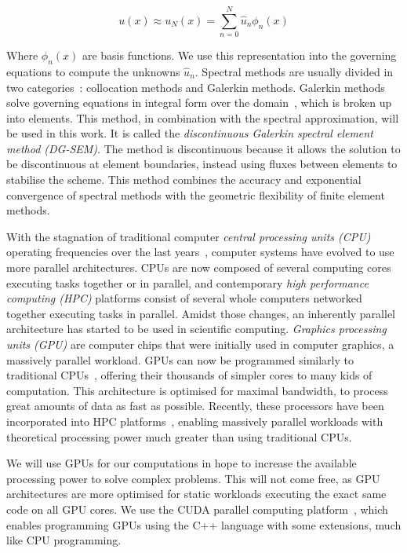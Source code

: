 \begin{equation}
	u(x) \approx u_N(x) = \sum_{n = 0}^{N} \widehat{u}_n \phi _n(x)
\end{equation}

Where $\phi _n(x)$ are basis functions. We use this representation into the governing equations to
compute the unknowns $\widehat{u}_n$. Spectral methods are usually divided in two
categories~\cite{Karniadakis2005}: collocation methods and Galerkin methods. Galerkin methods solve
governing equations in integral form over the domain~\cite{Reed1973}, which is broken up into
elements. This method, in combination with the spectral approximation, will be used in this work. It
is called the \textit{discontinuous Galerkin spectral element method (DG-SEM)}. The method is
discontinuous because it allows the solution to be discontinuous at element boundaries, instead
using fluxes between elements to stabilise the scheme. This method combines the accuracy and
exponential convergence of spectral methods with the geometric flexibility of finite element
methods. 

With the stagnation of traditional computer \textit{central processing units (CPU)} operating
frequencies over the last years~\cite{Parkhurst2006}, computer systems have evolved to use more
parallel architectures. CPUs are now composed of several computing cores~\cite{Nayfeh1997} executing
tasks together or in parallel, and contemporary \textit{high performance computing (HPC)} platforms
consist of several whole computers networked together executing tasks in parallel. Amidst those
changes, an inherently parallel architecture has started to be used in scientific computing.
\textit{Graphics processing units (GPU)} are computer chips that were initially used in computer
graphics, a massively parallel workload. GPUs can now be programmed similarly to traditional
CPUs~\cite{Owens2008}, offering their thousands of simpler cores to many kids of computation. This
architecture is optimised for maximal bandwidth, to process great amounts of data as fast as
possible. Recently, these processors have been incorporated into HPC platforms~\cite{Fan2004},
enabling massively parallel workloads with theoretical processing power much greater than using
traditional CPUs.

We will use GPUs for our computations in hope to increase the available processing power to solve
complex problems. This will not come free, as GPU architectures are more optimised for static
workloads executing the exact same code on all GPU cores. We use the CUDA parallel computing
platform~\cite{Garland2008}, which enables programming GPUs using the C++ language with some
extensions, much like CPU programming.

